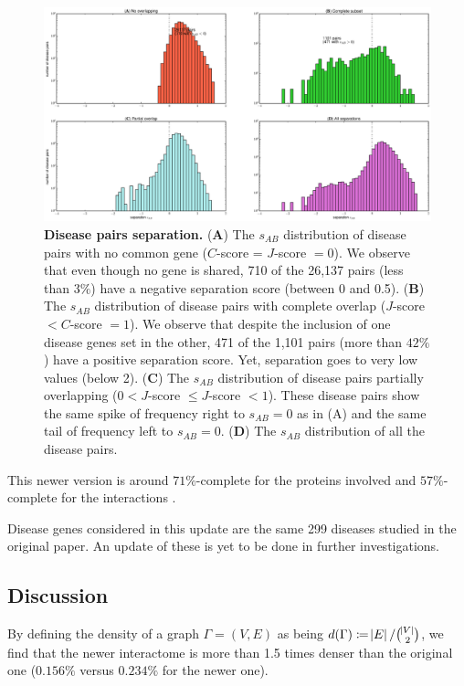 \documentclass[letterpaper]{article}
\begin{document}
		\begin{figure}[!t]
			\hspace{-1.8cm}
			\vspace{-1cm}
			\includegraphics[scale=.35]{images/s_AB_histograms.eps}
			\caption{\label{fig:s_AB histogram}
			{\bf Disease pairs separation.}
			({\bf A}) The $s_{AB}$ distribution of disease pairs with no common gene ($C$-score = $J$-score $= 0$). We
			observe that even though no gene is shared, 710 of the 26,137 pairs (less than $3\%$) have a negative
			separation score (between 0 and 0.5).
			({\bf B}) The $s_{AB}$ distribution of disease pairs with complete overlap ($J$-score $< C$-score $= 1$).
			We observe that despite the inclusion of one disease genes set in the other, 471 of the 1,101 pairs
			(more than $42\%$) have a positive separation score. Yet, separation goes to very low values (below 2).
			({\bf C}) The $s_{AB}$ distribution of disease pairs partially overlapping ($0 < J$-score $ \leq J$-score $< 1$).
			These disease pairs show the same spike of frequency right to $s_{AB} = 0$ as in (A) and the same tail of frequency
			left to $s_{AB} = 0$.
			({\bf D}) The $s_{AB}$ distribution of all the disease pairs.
			}
		\end{figure}

		This newer version is around $71\%$-complete for the proteins involved and $57\%$-complete for the
		interactions \citep{estimatingTheSizeOfTheHumanInteractome,ATruerMeasureOfOurIgnorance}.

		Disease genes considered in this update are the same 299 diseases studied in the original paper. An update of these
		is yet to be done in further investigations.

	\subsection{Discussion}
	By defining the density of a graph $\Gamma = (V, E)$ as being $d(\Gamma) \coloneqq \abs E/\binom {\abs V}2$,
	we find that the newer interactome is more than 1.5 times denser than the original one ($0.156\%$ versus $0.234\%$
	for the newer one).
\end{document}
